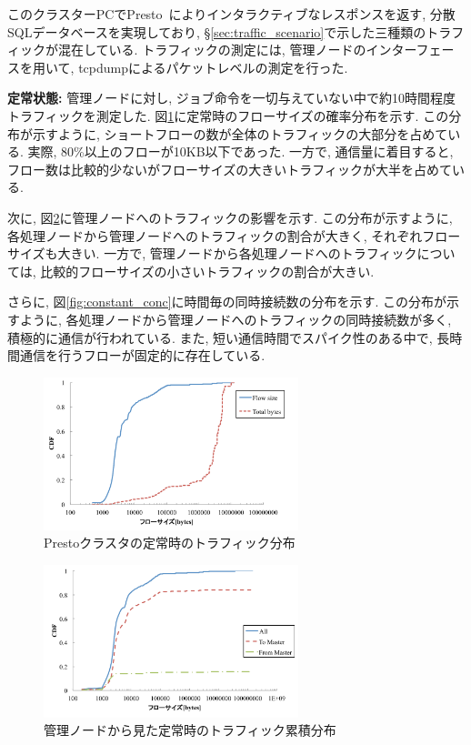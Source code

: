\documentclass[11pt, a4paper, twocolumn]{jsarticle}
\begin{document}
このクラスターPCでPresto~\cite{presto}によりインタラクティブなレスポンスを返す, 分散SQLデータベースを実現しており,
\S \ref{sec:traffic_scenario}で示した三種類のトラフィックが混在している.
トラフィックの測定には, 管理ノードのインターフェースを用いて, tcpdump\cite{tcpdump}によるパケットレベルの測定を行った.

{\bf 定常状態: }
管理ノードに対し, ジョブ命令を一切与えていない中で約10時間程度トラフィックを測定した.
図\ref{fig:constant}に定常時のフローサイズの確率分布を示す.
この分布が示すように, ショートフローの数が全体のトラフィックの大部分を占めている.
実際, 80\%以上のフローが10KB以下であった.
一方で, 通信量に着目すると, フロー数は比較的少ないがフローサイズの大きいトラフィックが大半を占めている.

次に, 図\ref{fig:constant_cdf}に管理ノードへのトラフィックの影響を示す.
この分布が示すように, 各処理ノードから管理ノードへのトラフィックの割合が大きく, それぞれフローサイズも大きい.
一方で, 管理ノードから各処理ノードへのトラフィックについては, 比較的フローサイズの小さいトラフィックの割合が大きい.

さらに, 図\ref{fig:constant_conc}に時間毎の同時接続数の分布を示す.
この分布が示すように, 各処理ノードから管理ノードへのトラフィックの同時接続数が多く, 積極的に通信が行われている.
また, 短い通信時間でスパイク性のある中で, 長時間通信を行うフローが固定的に存在している.

\begin{figure}[t]
    \begin{center}
    \includegraphics[autoebb, width=210pt]{./img/constant.pdf}
    \caption{Prestoクラスタの定常時のトラフィック分布}
    \label{fig:constant}
    \end{center}
\end{figure}

\begin{figure}[t]
    \begin{center}
    \includegraphics[autoebb, width=210pt]{./img/constant_cdf.pdf}
    \caption{管理ノードから見た定常時のトラフィック累積分布}
    \label{fig:constant_cdf}
    \end{center}
\end{figure}
\end{document}
